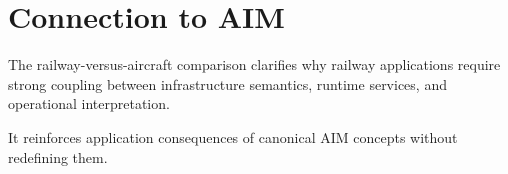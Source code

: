 \section{Connection to AIM}

\begin{summary}
The railway-versus-aircraft comparison clarifies why railway
applications require strong coupling between infrastructure semantics,
runtime services, and operational interpretation.

It reinforces application consequences of canonical AIM concepts without
redefining them.
\end{summary}
